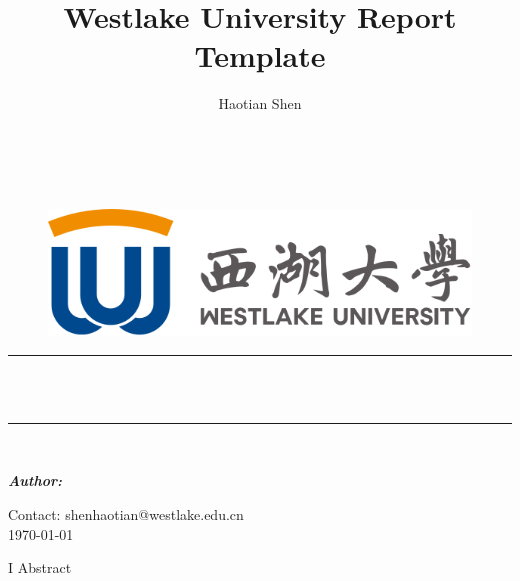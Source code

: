 \documentclass{article}
\title{\textbf {Westlake University Report Template} }
\author{\Large Haotian Shen\\~\\~}
\begin{document}

\setcounter{page}{0}
\begin{titlepage}
    \newcommand{\HRule}{\rule{\linewidth}{0.5mm}}
    \begin{figure}[!h]
        \centering
        \vspace{1cm}
        \includegraphics[scale=0.5]{logo.png}
        \label{fig:logo}
    \end{figure}
    
    \begin{center}
        \vspace{1cm}
    	\makeatletter
    	\HRule \\[1cm]
    	{ \huge \bfseries \@title}\\[0.4cm] 
    	\HRule \\[1.7cm]
        
    	\begin{minipage}{0.4\textwidth}
        \vspace{1cm}
    	\begin{center}
    			\emph{\textbf{\Large Author:}}\\
    			\@author 
    	\end{center}
    	\end{minipage}
        
    	\vfill 
    	\makeatother
    	{\large Contact: shenhaotian@westlake.edu.cn}\\[0.5cm]
    	{\large \today}\\[2cm] 
    \end{center}

\end{titlepage}

\setcounter{page}{1}
\sectionfont{\centering}
I
Abstract
\end{document}
